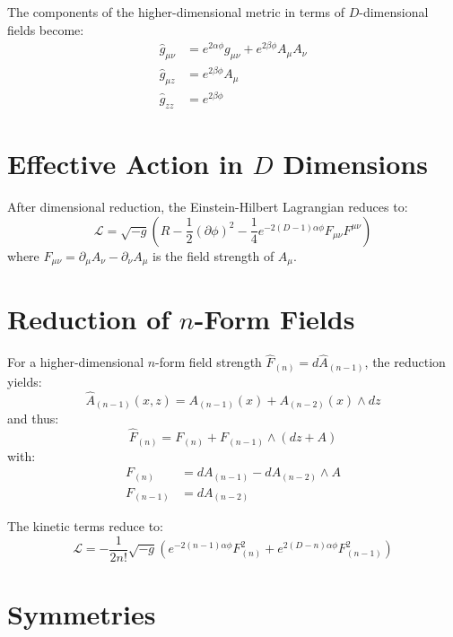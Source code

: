 The components of the higher-dimensional metric in terms of \( D \)-dimensional fields become:
\begin{align}
\hat{g}_{\mu\nu} &= e^{2\alpha \phi} g_{\mu\nu} + e^{2\beta \phi} A_\mu A_\nu \\
\hat{g}_{\mu z} &= e^{2\beta \phi} A_\mu \\
\hat{g}_{zz} &= e^{2\beta \phi}
\end{align}

\section*{Effective Action in \( D \) Dimensions}
After dimensional reduction, the Einstein-Hilbert Lagrangian reduces to:
\begin{equation}
\mathcal{L} = \sqrt{-g} \left( R - \frac{1}{2} (\partial \phi)^2 - \frac{1}{4} e^{-2(D-1)\alpha \phi} F_{\mu\nu} F^{\mu\nu} \right)
\end{equation}
where \( F_{\mu\nu} = \partial_\mu A_\nu - \partial_\nu A_\mu \) is the field strength of \( A_\mu \).

\section*{Reduction of \( n \)-Form Fields}

For a higher-dimensional \( n \)-form field strength \( \hat{F}_{(n)} = d\hat{A}_{(n-1)} \), the reduction yields:
\begin{equation}
\hat{A}_{(n-1)}(x,z) = A_{(n-1)}(x) + A_{(n-2)}(x) \wedge dz
\end{equation}
and thus:
\begin{equation}
\hat{F}_{(n)} = F_{(n)} + F_{(n-1)} \wedge (dz + A)
\end{equation}
with:
\begin{align}
F_{(n)} &= dA_{(n-1)} - dA_{(n-2)} \wedge A \\
F_{(n-1)} &= dA_{(n-2)}
\end{align}

The kinetic terms reduce to:
\begin{equation}
\mathcal{L} = -\frac{1}{2n!} \sqrt{-g} \left( e^{-2(n-1)\alpha \phi} F_{(n)}^2 + e^{2(D-n)\alpha \phi} F_{(n-1)}^2 \right)
\end{equation}

\section*{Symmetries}

